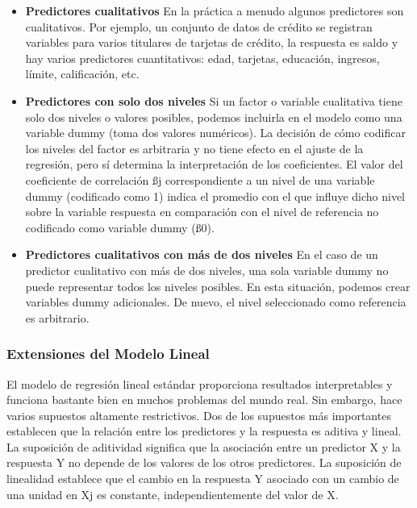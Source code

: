 \documentclass[
  letterpaper,
  DIV=11,
  numbers=noendperiod]{scrartcl}
\begin{document}
\begin{itemize}
\item
  \textbf{Predictores cualitativos} En la práctica a menudo algunos
  predictores son cualitativos. Por ejemplo, un conjunto de datos de
  crédito se registran variables para varios titulares de tarjetas de
  crédito, la respuesta es saldo y hay varios predictores cuantitativos:
  edad, tarjetas, educación, ingresos, límite, calificación, etc.
\item
  \textbf{Predictores con solo dos niveles} Si un factor o variable
  cualitativa tiene solo dos niveles o valores posibles, podemos
  incluirla en el modelo como una variable dummy (toma dos valores
  numéricos). La decisión de cómo codificar los niveles del factor es
  arbitraria y no tiene efecto en el ajuste de la regresión, pero sí
  determina la interpretación de los coeficientes. El valor del
  coeficiente de correlación ßj correspondiente a un nivel de una
  variable dummy (codificado como 1) indica el promedio con el que
  influye dicho nivel sobre la variable respuesta en comparación con el
  nivel de referencia no codificado como variable dummy (ß0).
\item
  \textbf{Predictores cualitativos con más de dos niveles} En el caso de
  un predictor cualitativo con más de dos niveles, una sola variable
  dummy no puede representar todos los niveles posibles. En esta
  situación, podemos crear variables dummy adicionales. De nuevo, el
  nivel seleccionado como referencia es arbitrario.
\end{itemize}

\hypertarget{extensiones-del-modelo-lineal}{%
\subsubsection{\texorpdfstring{\textbf{Extensiones del Modelo
Lineal}}{Extensiones del Modelo Lineal}}\label{extensiones-del-modelo-lineal}}

El modelo de regresión lineal estándar proporciona resultados
interpretables y funciona bastante bien en muchos problemas del mundo
real. Sin embargo, hace varios supuestos altamente restrictivos. Dos de
los supuestos más importantes establecen que la relación entre los
predictores y la respuesta es aditiva y lineal. La suposición de
aditividad significa que la asociación entre un predictor X y la
respuesta Y no depende de los valores de los otros predictores. La
suposición de linealidad establece que el cambio en la respuesta Y
asociado con un cambio de una unidad en Xj es constante,
independientemente del valor de X.
\end{document}
